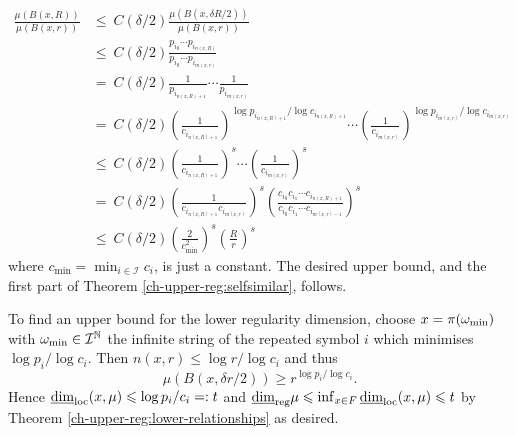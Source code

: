 \begin{align*}
\frac{\mu(B(x,R))}{\mu (B(x,r))}& \le \ C(\delta/2) \frac{\mu(B(x,\delta R/2))}{\mu (B(x,r))}  \\
& \le \ C(\delta/2) \frac{p_{i_0}\cdots p_{i_{n(x,R)}}}{p_{i_0}\cdots p_{i_{m(x,r)}}} \\
& =\  C(\delta/2)  \frac{1}{p_{i_{n(x,R)+1}}} \cdots \frac{1}{p_{i_{m(x,r)}}} \\
& = \ C(\delta/2)  \left(\frac{1}{c_{i_{n(x,R)+1}}}\right)^{\log p_{i_{n(x,R)+1}}/\log c_{i_{n(x,R)+1}}} \cdots \left(\frac{1}{c_{i_{m(x,r)}}}\right)^{\log p_{i_{m(x,r)}}/\log c_{i_{m(x,r)}}} \\
& \le\  C(\delta/2)  \left( \frac{1}{c_{i_{n(x,R)+1}}}\right)^s \cdots \left( \frac{1}{c_{i_{m(x,r)}}}\right)^s \\
& = \ C(\delta/2)  \left(\frac{1}{c_{i_{n(x,R)+1}} c_{i_{m(x,r)}}}\right)^s \left( \frac{c_{i_0}c_{i_1} \cdots c_{i_{n(x,R)+1}}}{c_{i_0}c_{i_1} \cdots c_{i_{m(x,r)-1}}}\right)^s \\
& \le \  C(\delta/2)   \left(\frac{2}{c_{\min}^2}\right)^s \left( \frac{R}{r}\right)^s
\end{align*}
where $c_{\min} = \min_{i\in \mathcal{I}}c_i$, is just a constant. The desired upper bound, and the first part of Theorem \ref{ch-upper-reg:selfsimilar}, follows.


To find an upper bound for the lower regularity dimension, choose $x = \pi (\omega_\textup{min})$ with $\omega_\textup{min} \in \mathcal{I}^{\mathbb{N}}$ the infinite string of the repeated symbol $i$ which minimises $\log p_i / \log c_i$. Then $n(x,r) \le  \log r / \log c_i$ and thus
\[
\mu(B(x,\delta r / 2)) \ge r^{\log p_i / \log c_i}.
\]
Hence $\underline{\dim}_{\textup{loc}}(x,\mu) \leqslant \log p_i/c_i =: t$ and $\underline{\dim}_{\textup{reg}} \mu \leqslant \inf_{x\in F} \underline{\dim}_{\textup{loc}}(x,\mu) \leqslant t$ by Theorem \ref{ch-upper-reg:lower-relationships} as desired.

